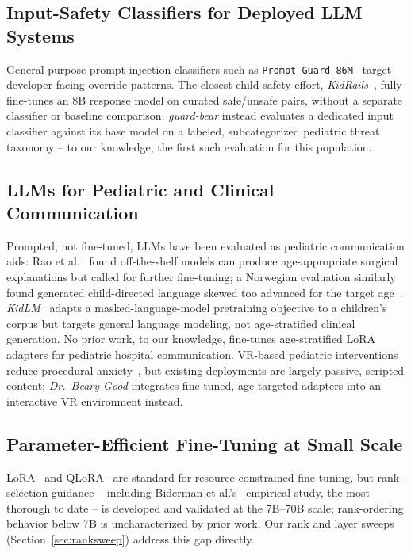 \documentclass[pdflatex,sn-mathphys-num]{sn-jnl}%
\begin{document}
\subsection{Input-Safety Classifiers for Deployed LLM Systems}

General-purpose prompt-injection classifiers such as \texttt{Prompt-Guard-86M}~\cite{promptguard2024} target developer-facing override patterns. The closest child-safety effort, \textit{KidRails}~\cite{kidrails2025}, fully fine-tunes an 8B response model on curated safe/unsafe pairs, without a separate classifier or baseline comparison. \textit{guard-bear} instead evaluates a dedicated input classifier against its base model on a labeled, subcategorized pediatric threat taxonomy -- to our knowledge, the first such evaluation for this population.

\subsection{LLMs for Pediatric and Clinical Communication}

Prompted, not fine-tuned, LLMs have been evaluated as pediatric communication aids: Rao et al.~\cite{rao2025pediatric} found off-the-shelf models can produce age-appropriate surgical explanations but called for further fine-tuning; a Norwegian evaluation similarly found generated child-directed language skewed too advanced for the target age~\cite{hassan2025childconv}. \textit{KidLM}~\cite{nayeem2024kidlm} adapts a masked-language-model pretraining objective to a children's corpus but targets general language modeling, not age-stratified clinical generation. No prior work, to our knowledge, fine-tunes age-stratified LoRA adapters for pediatric hospital communication. VR-based pediatric interventions reduce procedural anxiety~\cite{ryu2021vr}, but existing deployments are largely passive, scripted content; \textit{Dr.\ Beary Good} integrates fine-tuned, age-targeted adapters into an interactive VR environment instead.

\subsection{Parameter-Efficient Fine-Tuning at Small Scale}

LoRA~\cite{hu2022lora} and QLoRA~\cite{dettmers2023qlora} are standard for resource-constrained fine-tuning, but rank-selection guidance -- including Biderman et al.'s~\cite{biderman2024lora} empirical study, the most thorough to date -- is developed and validated at the 7B--70B scale; rank-ordering behavior below 7B is uncharacterized by prior work. Our rank and layer sweeps (Section~\ref{sec:ranksweep}) address this gap directly.
\end{document}
